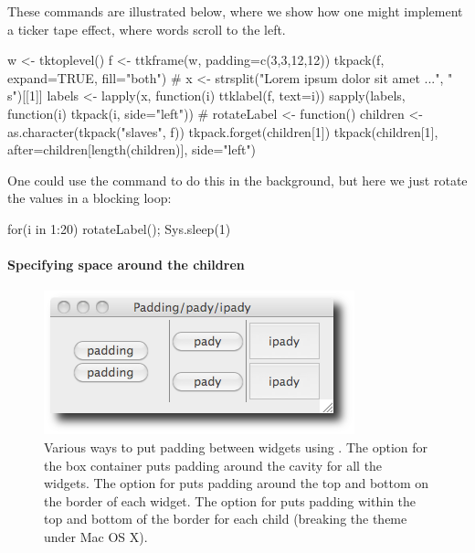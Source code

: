These commands are illustrated below, where we show how one might
implement a ticker tape effect, where words scroll to the left.
\begin{Schunk}
\begin{Sinput}
 w <- tktoplevel()
 f <- ttkframe(w, padding=c(3,3,12,12))
 tkpack(f, expand=TRUE, fill="both")
 #
 x <- strsplit("Lorem ipsum dolor sit amet ...", "\\s")[[1]]
 labels <- lapply(x, function(i) ttklabel(f, text=i))
 sapply(labels, function(i) tkpack(i, side="left"))
 #
 rotateLabel <- function() {
   children <- as.character(tkpack("slaves", f))
   tkpack.forget(children[1])
   tkpack(children[1], after=children[length(children)], 
          side="left")
 }
\end{Sinput}
\end{Schunk}

One could use the  command to do this in the background,
but here we just rotate the values in a blocking loop:
\begin{Schunk}
\begin{Sinput}
 for(i in 1:20) {rotateLabel(); Sys.sleep(1)}
\end{Sinput}
\end{Schunk}


\paragraph{Specifying space around the children}

\begin{figure}
  \centering
  \includegraphics[width=.6\textwidth]{fig-tcltk-padding-pady-ipady}
  \caption{Various ways to put padding between widgets using
    . The  option for the box container
    puts padding around the cavity for all the widgets. The
     option for  puts padding around the
    top and bottom on the border of each widget. The 
    option for  puts padding within the top and
    bottom of the border for each child (breaking the theme under Mac
    OS X).}
  \label{fig:fig-pack-example}
\end{figure}


